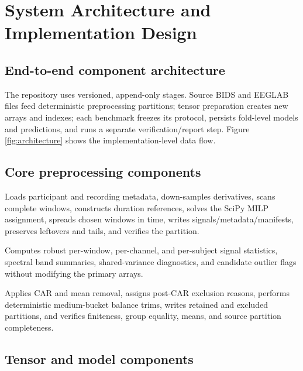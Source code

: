 \chapter{System Architecture and Implementation Design}
\label{ch:architecture}

\section{End-to-end component architecture}

The repository uses versioned, append-only stages. Source BIDS and EEGLAB files
feed deterministic preprocessing partitions; tensor preparation creates new
arrays and indexes; each benchmark freezes its protocol, persists fold-level
models and predictions, and runs a separate verification/report step. Figure
\ref{fig:architecture} shows the implementation-level data flow.



\section{Core preprocessing components}

\begin{description}[style=nextline]
  \item[\path{preprocessing/build_balanced_dataset.py}]
  Loads participant and recording metadata, down-samples derivatives, scans
  complete windows, constructs \FTD{} duration references, solves the SciPy MILP
  assignment, spreads chosen windows in time, writes signals/metadata/manifests,
  preserves leftovers and tails, and verifies the partition.

  \item[\path{preprocessing/audit_primary_signal_quality.py}]
  Computes robust per-window, per-channel, and per-subject signal statistics,
  spectral band summaries, shared-variance diagnostics, and candidate outlier
  flags without modifying the primary arrays.

  \item[\path{preprocessing/build_clean_primary_dataset.py}]
  Applies CAR and mean removal, assigns post-CAR exclusion reasons, performs
  deterministic medium-bucket balance trims, writes retained and excluded
  partitions, and verifies finiteness, group equality, means, and source
  partition completeness.
\end{description}

\section{Tensor and model components}

